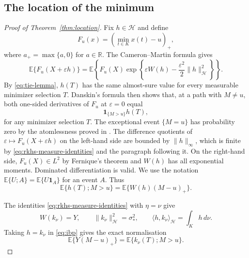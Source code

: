 \documentclass[11pt]{amsart}
\theoremstyle{definition}
\theoremstyle{remark}
\newcommand{\Ee}{\mathbb E}
\newcommand{\cH}{\mathcal H}
\begin{document}
\subsection{The location of the minimum}

\begin{proof}[Proof of Theorem~\ref{thm:location}]
Fix $h\in\cH$ and define
\[
 F_u(x)=\left(\min_{t\in K}x(t)-u\right)_+,
\]
where $a_+=\max\{a,0\}$ for $a\in\mathbb R$.
The Cameron--Martin formula gives
\[
 \Ee\{F_u(X+\varepsilon h)\}
 =\Ee\left\{F_u(X)
   \exp\left\{\varepsilon W(h)
   -\frac{\varepsilon^2}{2}\|h\|_{\cH}^2\right\}\right\}.
\]
By \eqref{eq:tie-lemma}, $h(T)$ has the same almost-sure value for every
measurable minimizer selection $T$.  Danskin's formula then shows that,
at a path with $M\ne u$, both one-sided derivatives of $F_u$ at
$\varepsilon=0$ equal
\[
 \mathbf1_{\{M>u\}}h(T),
\]
for any minimizer selection $T$.  The exceptional event $\{M=u\}$ has
probability zero by the atomlessness proved in .  The difference
quotients of $\varepsilon\mapsto F_u(X+\varepsilon h)$ on the left-hand
side are bounded by $\|h\|_\infty$, which is finite by
\eqref{eq:rkhs-measure-identities} and the paragraph following it.  On
the right-hand side,
$F_u(X)\in L^2$ by Fernique's theorem
and $W(h)$ has all exponential moments.  Dominated differentiation is
valid.  We use the notation
$\Ee\{U;A\}=\Ee\{U\mathbf1_A\}$ for an event $A$.  Thus
\begin{equation}
 \Ee\{h(T);M>u\}=\Ee\{W(h)(M-u)_+\}.
 \label{eq:ibp}
\end{equation}

The identities \eqref{eq:rkhs-measure-identities} with $\eta=\nu$ give
\[
 W(k_\nu)=Y,
 \qquad
 \|k_\nu\|_{\cH}^2=\sigma_*^2,
 \qquad
 \langle h,k_\nu\rangle_{\cH}=\int_Kh\,d\nu.
\]
Taking $h=k_\nu$ in \eqref{eq:ibp} gives the exact normalisation
\begin{equation}
 \Ee\{Y(M-u)_+\}=\Ee\{k_\nu(T);M>u\}.
 \label{eq:normalization}
\end{equation}


\end{proof}
\end{document}
